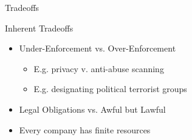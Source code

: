 \documentclass[nobackground,dvipsnames,table]{beamer}
\begin{document}
\begin{frame}{}
    \thispagestyle{empty}
    Tradeoffs
\end{frame}

\begin{frame}{}
    \thispagestyle{empty}
\end{frame}

\begin{frame}{}
    \thispagestyle{empty}
\end{frame}

\begin{frame}{Inherent Tradeoffs}
    \begin{itemize}
        \item Under-Enforcement vs. Over-Enforcement
        \begin{itemize}
            \item E.g. privacy v. anti-abuse scanning 
            \item E.g. designating political terrorist groups
        \end{itemize}
        \item Legal Obligations vs. Awful but Lawful 
        \item Every company has finite resources
    \end{itemize}
\end{frame}

\backpage
\end{document}
